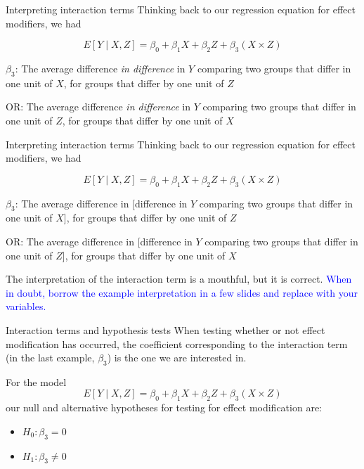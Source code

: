 \documentclass[10pt,t]{beamer}
\begin{document}
\begin{frame}{Interpreting interaction terms}
Thinking back to our regression equation for effect modifiers, we had

$$
E[Y \mid X, Z] = \beta_0 + \beta_1 X + \beta_2 Z + \beta_3 (X \times Z)
$$

$\beta_3$: The average difference \textit{in difference} in $Y$ comparing two groups that differ in one unit of $X$, for groups that differ by one unit of $Z$ 

\vspace{0.3cm}

OR: The average difference \textit{in difference} in $Y$ comparing two groups that differ in one unit of $Z$, for groups that differ by one unit of $X$


\end{frame}

\begin{frame}{Interpreting interaction terms}
Thinking back to our regression equation for effect modifiers, we had

$$
E[Y \mid X, Z] = \beta_0 + \beta_1 X + \beta_2 Z + \beta_3 (X \times Z)
$$

$\beta_3$: The average difference in [difference in $Y$ comparing two groups that differ in one unit of $X$], for groups that differ by one unit of $Z$ 

\vspace{0.3cm}

OR: The average difference in [difference in $Y$ comparing two groups that differ in one unit of $Z$], for groups that differ by one unit of $X$

\vspace{0.3cm}
\pause
The interpretation of the interaction term is a mouthful, but it is correct. \textcolor{blue}{When in doubt, borrow the example interpretation in a few slides and replace with your variables.}

\vspace{0.3cm}

\end{frame}

\begin{frame}{Interaction terms and hypothesis tests}
When testing whether or not effect modification has occurred, the coefficient corresponding to the interaction term (in the last example, $\beta_3$) is the one we are interested in. 

\vspace{0.3cm}

For the model
$$
E[Y \mid X, Z] = \beta_0 + \beta_1 X + \beta_2 Z + \beta_3 (X \times Z)
$$
our null and alternative hypotheses for testing for effect modification are:

\vspace{0.3cm}

\begin{itemize}
	\item $H_0: \beta_3 = 0$
	\item $H_1: \beta_3 \neq 0$
\end{itemize}

\end{frame}
\end{document}
